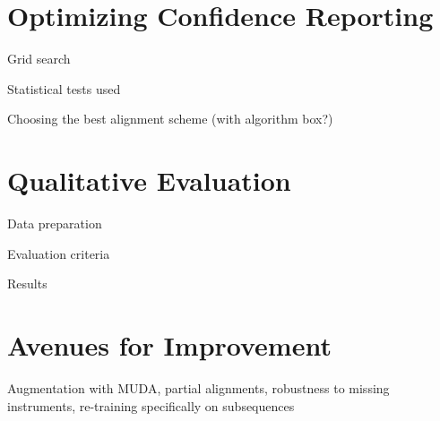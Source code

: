 \documentclass{article}
\begin{document}
\section{Optimizing Confidence Reporting}
\label{sec:confidence}

Grid search

Statistical tests used

Choosing the best alignment scheme (with algorithm box?)

\section{Qualitative Evaluation}
\label{sec:qualitative}

Data preparation

Evaluation criteria

Results

\section{Avenues for Improvement}
\label{sec:avenues}

Augmentation with MUDA, partial alignments, robustness to missing instruments, re-training specifically on subsequences



\end{document}
